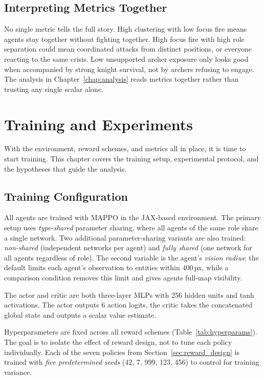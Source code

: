 \section{Interpreting Metrics Together}
\label{sec:metric_interpretation}

No single metric tells the full story. High clustering with low focus fire means agents stay together without fighting together. High focus fire with high role separation could mean coordinated attacks from distinct positions, or everyone reacting to the same crisis. Low unsupported archer exposure only looks good when accompanied by strong knight survival, not by archers refusing to engage. The analysis in Chapter~\ref{chap:analysis} reads metrics together rather than trusting any single scalar alone.

\chapter{Training and Experiments}
\label{chap:training}

With the environment, reward schemes, and metrics all in place, it is time to start training. This chapter covers the training setup, experimental protocol, and the hypotheses that guide the analysis.

\section{Training Configuration}

All agents are trained with MAPPO in the JAX-based environment. The primary setup uses \emph{type-shared} parameter sharing, where all agents of the same role share a single network. Two additional parameter-sharing variants are also trained: \emph{non-shared} (independent networks per agent) and \emph{fully shared} (one network for all agents regardless of role). The second variable is the agent's \emph{vision radius}: the default limits each agent's observation to entities within 400\,px, while a comparison condition removes this limit and gives agents full-map visibility.

The actor and critic are both three-layer MLPs with 256 hidden units and tanh activations. The actor outputs 6 action logits, the critic takes the concatenated global state and outputs a scalar value estimate.

Hyperparameters are fixed across all reward schemes (Table~\ref{tab:hyperparams}). The goal is to isolate the effect of reward design, not to tune each policy individually. Each of the seven policies from Section~\ref{sec:reward_design} is trained with \emph{five predetermined seeds} (42, 7, 999, 123, 456) to control for training variance.

